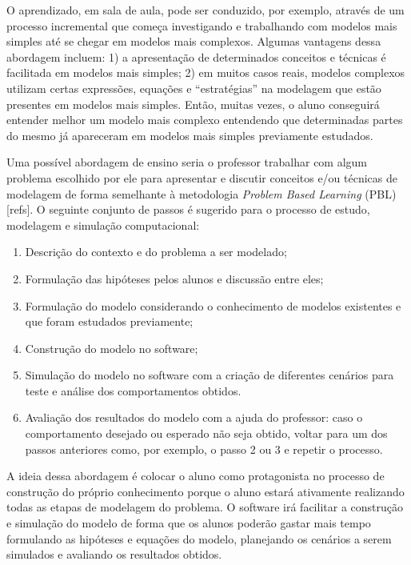 \documentclass[
	12pt,				%
	openright,			%
	oneside,			%
	a4paper,			%
	main=brazil,
	english,			%
	]{ufsj-abntex2}
\begin{document}
O aprendizado, em sala de aula, pode ser conduzido, por exemplo, através de um processo incremental que começa investigando e trabalhando com modelos mais simples até se chegar em modelos mais complexos. Algumas vantagens dessa abordagem incluem:  1) a apresentação de determinados conceitos e técnicas é facilitada em modelos mais simples; 2) em muitos casos reais, modelos complexos utilizam certas expressões, equações e “estratégias” na modelagem que estão presentes em modelos mais simples. Então, muitas vezes, o aluno conseguirá entender melhor um modelo mais complexo entendendo que determinadas partes do mesmo já apareceram em modelos mais simples previamente estudados. 

Uma possível abordagem de ensino seria o professor trabalhar com algum problema escolhido por ele para apresentar e discutir conceitos e/ou técnicas de modelagem de forma semelhante à metodologia \textit{Problem Based Learning} (PBL) [refs]. O seguinte conjunto de passos é sugerido para o processo de estudo, modelagem e simulação computacional: 

\begin{enumerate}
 \item Descrição do contexto e do problema a ser modelado;
 \item Formulação das hipóteses pelos alunos e discussão entre eles;
 \item Formulação do modelo considerando o conhecimento de modelos existentes e que foram estudados previamente;
 \item Construção do modelo no software;
 \item Simulação do modelo no software com a criação de diferentes cenários para teste e análise dos comportamentos obtidos.
 \item Avaliação dos resultados do modelo com a ajuda do professor: caso o comportamento desejado ou esperado não seja obtido, voltar para um dos passos anteriores como, por exemplo, o passo 2 ou 3 e repetir o processo. 
\end{enumerate}

A ideia dessa abordagem é colocar o aluno como protagonista no processo de construção do próprio conhecimento porque o aluno estará ativamente realizando todas as etapas de modelagem do problema. O software irá facilitar a construção e simulação do modelo de forma que os alunos poderão gastar mais tempo formulando as hipóteses e equações do modelo, planejando os cenários a serem simulados e avaliando os resultados obtidos. 
\end{document}
